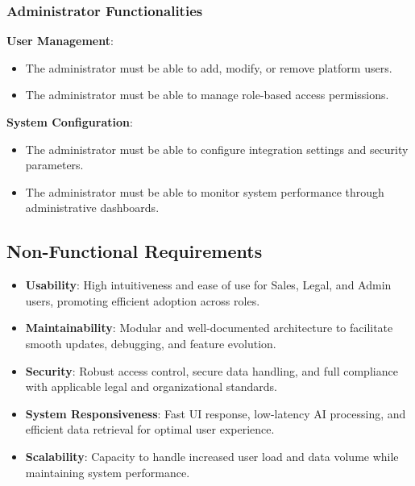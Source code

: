 \subsubsection{Administrator Functionalities}

\textbf{User Management}:\vspace{0.4em}
\begin{adjustwidth}{3em}{1em}
    \begin{itemize}
        \item The administrator must be able to add, modify, or remove platform users.\vspace{0.4em}
        \item The administrator must be able to manage role-based access permissions.
    \end{itemize}
\end{adjustwidth}\vspace{0.85em} 

\textbf{System Configuration}:\vspace{0.4em}
\begin{adjustwidth}{3em}{1em}
    \begin{itemize}
        \item The administrator must be able to configure integration settings and security parameters.\vspace{0.4em}
        \item The administrator must be able to monitor system performance through administrative dashboards.
    \end{itemize}
\end{adjustwidth}\vspace{0.85em} 

\subsection{Non-Functional Requirements}
\begin{itemize}
    \item \textbf{Usability}: High intuitiveness and ease of use for Sales, Legal, and Admin users, promoting efficient adoption across roles.
    \item \textbf{Maintainability}: Modular and well-documented architecture to facilitate smooth updates, debugging, and feature evolution.
    \item \textbf{Security}: Robust access control, secure data handling, and full compliance with applicable legal and organizational standards.
    \item \textbf{System Responsiveness}: Fast UI response, low-latency AI processing, and efficient data retrieval for optimal user experience.
    \item \textbf{Scalability}: Capacity to handle increased user load and data volume while maintaining system performance.
\end{itemize}

